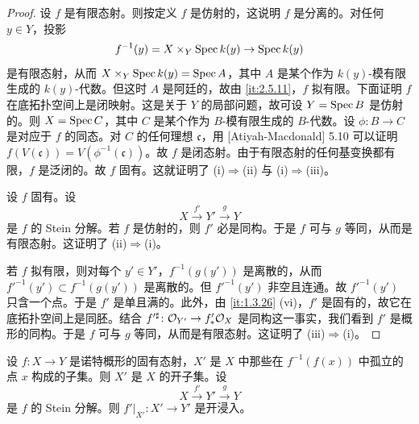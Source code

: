 \begin{proof}
设 $f$ 是有限态射。则按定义 $f$ 是仿射的，这说明 $f$ 是分离的。对任何 $y\in Y$，投影
\[
f^{-1}(y)=X\times_Y\operatorname{Spec} k(y)\to\operatorname{Spec} k(y)
\]
是有限态射，从而 $X\times_Y\operatorname{Spec} k(y)=\operatorname{Spec} A$，其中 $A$ 是某个作为 $k(y)$-模有限生成的 $k(y)$-代数。但这时 $A$ 是阿廷的，故由 \ref{it:2.5.11}，$f$ 拟有限。下面证明 $f$ 在底拓扑空间上是闭映射。这是关于 $Y$ 的局部问题，故可设 $Y=\operatorname{Spec} B$ 是仿射的。则 $X=\operatorname{Spec} C$，其中 $C$ 是某个作为 $B$-模有限生成的 $B$-代数。设 $\phi\colon B\to C$ 是对应于 $f$ 的同态。对 $C$ 的任何理想 $\mathfrak{c}$，用 [Atiyah-Macdonald] 5.10 可以证明 $f(V(\mathfrak{c}))=V(\phi^{-1}(\mathfrak{c}))$。故 $f$ 是闭态射。由于有限态射的任何基变换都有限，$f$ 是泛闭的。故 $f$ 固有。这就证明了 (i)$\Rightarrow$(ii) 与 (i)$\Rightarrow$(iii)。

设 $f$ 固有。设
\[
X\xrightarrow{f'}Y'\xrightarrow{g}Y
\]
是 $f$ 的 Stein 分解。若 $f$ 是仿射的，则 $f'$ 必是同构。于是 $f$ 可与 $g$ 等同，从而是有限态射。这证明了 (ii)$\Rightarrow$(i)。

若 $f$ 拟有限，则对每个 $y'\in Y'$，$f^{-1}(g(y'))$ 是离散的，从而 $f'^{-1}(y')\subset f^{-1}(g(y'))$ 是离散的。但 $f'^{-1}(y')$ 非空且连通。故 $f'^{-1}(y')$ 只含一个点。于是 $f'$ 是单且满的。此外，由 \ref{it:1.3.26} (vi)，$f'$ 是固有的，故它在底拓扑空间上是同胚。结合 $f'^{\sharp}\colon\mathcal{O}_{Y'}\to f'_*\mathcal{O}_X$ 是同构这一事实，我们看到 $f'$ 是概形的同构。于是 $f$ 可与 $g$ 等同，从而是有限态射。这证明了 (iii)$\Rightarrow$(i)。
\end{proof}

\begin{proposition}\label{it:2.5.13}
设 $f\colon X\to Y$ 是诺特概形的固有态射，$X'$ 是 $X$ 中那些在 $f^{-1}(f(x))$ 中孤立的点 $x$ 构成的子集。则 $X'$ 是 $X$ 的开子集。设
\[
X\xrightarrow{f'}Y'\xrightarrow{g}Y
\]
是 $f$ 的 Stein 分解。则 $f'|_{X'}\colon X'\to Y'$ 是开浸入。
\end{proposition}

